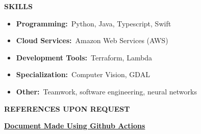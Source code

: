 \textbf{SKILLS}

\begin{itemize}
\item
  \textbf{Programming:}~Python, Java, Typescript, Swift
\item
  \textbf{Cloud Services:}~Amazon Web Services (AWS)
\item
  \textbf{Development Tools:}~Terraform, Lambda
\item
  \textbf{Specialization:}~Computer Vision, GDAL
\item
  \textbf{Other:}~Teamwork, software engineering, neural networks
\end{itemize}

\textbf{REFERENCES UPON REQUEST}

\href{http://github.com/TomTheTonk/Resume}{\textbf{Document Made Using
Github Actions}}
